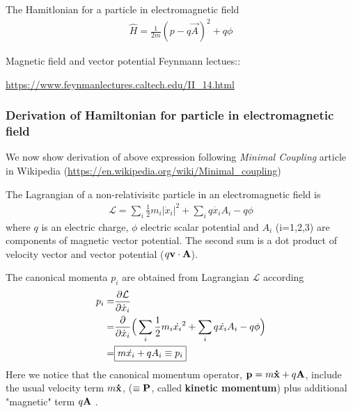 \documentclass[11pt]{article}
\begin{document}
 The Hamitlonian for a particle in electromagnetic field  
\begin{align}\boxed{
\hat H =  \frac{1}{2m}  (p - q \vec A)^2  + q\phi}
\label{eq:H_EM}
\end{align}


Magnetic field and vector potential Feynmann lectues::

\url{https://www.feynmanlectures.caltech.edu/II_14.html }
\subsubsection{Derivation of Hamiltonian for particle in electromagnetic field}
\label{sec:gauge_classical} 

We  now show derivation of above  expression following  \emph{Minimal Coupling} article in  Wikipedia (\url{https://en.wikipedia.org/wiki/Minimal_coupling})

The Lagrangian of a non-relativisitc  particle in an electromagnetic field
is
\begin{align*}
    \mathcal{ L } = \sum_i  \frac{1}{2}  m_i |\dot{ x}_i|^2 + \sum_i q \dot{ x_i} A_i -q \phi
\end{align*}
where $q$ is an electric charge, $\phi$ electric scalar potential and $A_i$ (i=1,2,3) are components of magnetic vector potential.  The second sum is a dot product of velocity vector and vector potential ($q\vb v \cdot \vb A$). 

The canonical momenta $p_i$  are  obtained from Lagrangian $\mathcal{L}$ according  
\begin{align}
    p_i = & \pdv{\mathcal{ L}}{ \dot{x}_i}  \nonumber \\
       = &  \pdv{\mathcal{ }}{ \dot{x}_i}  \Big(  \sum_i  \frac{1}{2}  m_i \dot{ x_i}^2 + \sum_i q \dot{x_i} A_i -q \phi  \Big) \nonumber \\
        = & \boxed{ m\dot{x_i} +q A_i \equiv p_i}
        \label{eq:p_canonical}
\end{align}
Here we notice that the canonical momentum operator, 
$\vb p =m  \vb{ \dot x} +q \vb A $,  include the usual velocity term $m \vb{ \dot x}$, ($\equiv \vb P$, called {\bf kinetic momentum}) plus additional "magnetic" term $q \vb A$ .   
\end{document}
